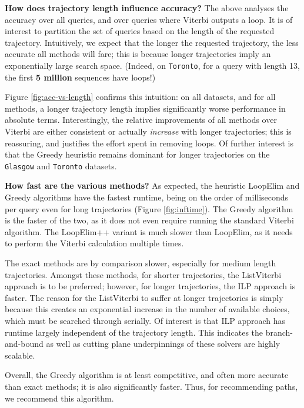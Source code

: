 \textbf{How does trajectory length influence accuracy?}
The above analyses the accuracy over all queries, and over queries where {\sc Viterbi} outputs a loop.
It is of interest to partition the set of queries based on the length of the requested trajectory.
Intuitively, we expect that the longer the requested trajectory, the less accurate all methods will fare; this is because longer trajectories imply an 
exponentially large search space.
(Indeed, on {\tt Toronto}, for a query with length 13, the first \textbf{5 million} sequences have loops!)

Figure \ref{fig:acc-vs-length} confirms this intuition:
on all datasets, and for all methods,
a longer trajectory length implies significantly worse performance in absolute terms.
Interestingly, the relative improvements of all methods over {\sc Viterbi} are either consistent or actually \emph{increase} with longer trajectories;
this is reassuring, and justifies the effort spent in removing loops.
Of further interest is that the {\sc Greedy} heuristic remains dominant for longer trajectories on the {\tt Glasgow} and {\tt Toronto} datasets.


\textbf{How fast are the various methods?}
As expected, the heuristic {\sc LoopElim} and {\sc Greedy} algorithms have the fastest runtime, being on the order of milliseconds per query even for long trajectories (Figure \ref{fig:inftime}).
The {\sc Greedy} algorithm is the faster of the two, as it does not even require running the standard Viterbi algorithm.
The {\sc LoopElim++} variant is much slower than {\sc LoopElim}, as it needs to perform the Viterbi calculation multiple times.

The exact methods are by comparison slower, especially for medium length trajectories.
Amongst these methods, for shorter trajectories, the {\sc ListViterbi} approach is to be preferred;
however, for longer trajectories, the {\sc ILP} approach is faster.
The reason for the {\sc ListViterbi} to suffer at longer trajectories is simply because this creates an exponential increase in the number of available choices, which must be searched through serially.
Of interest is that {\sc ILP} approach has runtime largely independent of the trajectory length.
This indicates the branch-and-bound as well as cutting plane underpinnings of these solvers are highly scalable.

Overall, the {\sc Greedy} algorithm is at least competitive, and often more accurate than exact methods;
it is also significantly faster.
Thus, for recommending paths, we recommend this algorithm.

